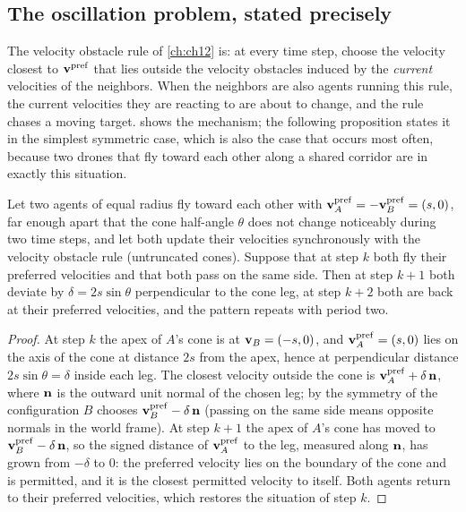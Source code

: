 \subsection{The oscillation problem, stated precisely}
\label{sec:ch13-dance}

The velocity obstacle rule of \cref{ch:ch12} is: at every time step, choose the
velocity closest to $\mathbf{v}^{\mathrm{pref}}$ that lies outside the velocity
obstacles induced by the \emph{current} velocities of the neighbors. When
the neighbors are also agents running this rule, the current velocities they
are reacting to are about to change, and the rule chases a moving target.
 shows the mechanism; the following proposition states
it in the simplest symmetric case, which is also the case that occurs most
often, because two drones that fly toward each other along a shared corridor
are in exactly this situation.

\begin{proposition}
\label{thm:ch13-dance}
Let two agents of equal radius fly toward each other with
$\mathbf{v}_A^{\mathrm{pref}} = -\mathbf{v}_B^{\mathrm{pref}} = (s, 0)$, far enough apart
that the cone half-angle $\theta$ does not change noticeably during two
time steps, and let both update their velocities synchronously with the
velocity obstacle rule (untruncated cones). Suppose that at step $k$ both
fly their preferred velocities and that both pass on the same side. Then at
step $k+1$ both deviate by $\delta = 2 s \sin\theta$ perpendicular to the
cone leg, at step $k+2$ both are back at their preferred velocities, and the
pattern repeats with period two.
\end{proposition}
\begin{proof}
At step $k$ the apex of $A$'s cone is at $\mathbf{v}_B = (-s, 0)$, and
$\mathbf{v}_A^{\mathrm{pref}} = (s, 0)$ lies on the axis of the cone at distance
$2s$ from the apex, hence at perpendicular distance $2s\sin\theta = \delta$
inside each leg. The closest velocity outside the cone is
$\mathbf{v}_A^{\mathrm{pref}} + \delta\,\mathbf{n}$, where $\mathbf{n}$ is the outward
unit normal of the chosen leg; by the symmetry of the configuration $B$
chooses $\mathbf{v}_B^{\mathrm{pref}} - \delta\,\mathbf{n}$ (passing on the same side
means opposite normals in the world frame). At step $k+1$ the apex of $A$'s
cone has moved to $\mathbf{v}_B^{\mathrm{pref}} - \delta\,\mathbf{n}$, so the signed
distance of $\mathbf{v}_A^{\mathrm{pref}}$ to the leg, measured along $\mathbf{n}$,
has grown from $-\delta$ to $0$: the preferred velocity lies on the boundary
of the cone and is permitted, and it is the closest permitted velocity to
itself. Both agents return to their preferred velocities, which restores the
situation of step $k$.
\end{proof}

